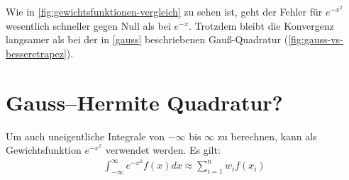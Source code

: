 \documentclass[12pt,a4paper]{scrartcl}
\numberwithin{equation}{section}
\numberwithin{myalgctr}{section}
\numberwithin{mytheoremctr}{section}
\numberwithin{mykorollarctr}{section}
\numberwithin{mylemmactr}{section}
\numberwithin{mybeispielctr}{section}
\begin{document}
	Wie in \cref{fig:gewichtsfunktionen-vergleich} zu sehen ist, geht der Fehler f\"ur $e^{-x^2}$ wesentlich schneller gegen Null als bei $e^{-x}$. Trotzdem bleibt die Konvergenz langsamer als bei der in \cref{gauss} beschriebenen Gau\ss -Quadratur (\cref{fig:gauss-vs-besseretrapez}).


	\section{Gauss–Hermite Quadratur?}
	  Um auch uneigentliche Integrale von $-\infty$ bis $\infty$ zu berechnen, kann als Gewichtsfunktion $e^{-x^2}$ verwendet werden. Es gilt:
	  \begin{align*}
	  	\int_{-\infty}^{\infty}e^{-x^2}f(x)dx \approx \sum_{i=1}^{n}w_if(x_i)
	  \end{align*}
	\newpage
	\printbibliography
	\listoffigures
	\listoftables
	
\end{document}
